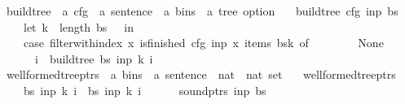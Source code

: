 \begin{isabellebody}
\isanewline
{}\isamarkupfalse%
\ build{\isacharunderscore}{\kern0pt}tree\ {\isacharcolon}{\kern0pt}{\isacharcolon}{\kern0pt}\ {\isachardoublequoteopen}{\isacharprime}{\kern0pt}a\ cfg\ {\isasymRightarrow}\ {\isacharprime}{\kern0pt}a\ sentence\ {\isasymRightarrow}\ {\isacharprime}{\kern0pt}a\ bins\ {\isasymRightarrow}\ {\isacharprime}{\kern0pt}a\ tree\ option{\isachardoublequoteclose}\ \isanewline
\ \ {\isachardoublequoteopen}build{\isacharunderscore}{\kern0pt}tree\ cfg\ inp\ bs\ {\isacharequal}{\kern0pt}\ {\isacharparenleft}{\kern0pt}\isanewline
\ \ \ \ let\ k\ {\isacharequal}{\kern0pt}\ length\ bs\ {\isacharminus}{\kern0pt}\ {}\ in\ {\isacharparenleft}{\kern0pt}\isanewline
\ \ \ \ case\ filter{\isacharunderscore}{\kern0pt}with{\isacharunderscore}{\kern0pt}index\ {\isacharparenleft}{\kern0pt}{\isasymlambda}x{\isachardot}{\kern0pt}\ is{\isacharunderscore}{\kern0pt}finished\ cfg\ inp\ x{\isacharparenright}{\kern0pt}\ {\isacharparenleft}{\kern0pt}items\ {\isacharparenleft}{\kern0pt}bs{\isacharbang}{\kern0pt}k{\isacharparenright}{\kern0pt}{\isacharparenright}{\kern0pt}\ of\isanewline
\ \ \ \ \ \ {\isacharbrackleft}{\kern0pt}{\isacharbrackright}{\kern0pt}\ {\isasymRightarrow}\ None\isanewline
\ \ \ \ {\isacharbar}{\kern0pt}\ {\isacharparenleft}{\kern0pt}{\isacharunderscore}{\kern0pt}{\isacharcomma}{\kern0pt}\ i{\isacharparenright}{\kern0pt}{\isacharhash}{\kern0pt}{\isacharunderscore}{\kern0pt}\ {\isasymRightarrow}\ build{\isacharunderscore}{\kern0pt}tree{\isacharprime}{\kern0pt}\ bs\ inp\ k\ i\isanewline
\ \ {\isacharparenright}{\kern0pt}{\isacharparenright}{\kern0pt}{\isachardoublequoteclose}\isanewline
\isanewline
\isanewline
{}\isamarkupfalse%
\ wellformed{\isacharunderscore}{\kern0pt}tree{\isacharunderscore}{\kern0pt}ptrs\ {\isacharcolon}{\kern0pt}{\isacharcolon}{\kern0pt}\ {\isachardoublequoteopen}{\isacharparenleft}{\kern0pt}{\isacharprime}{\kern0pt}a\ bins\ {\isasymtimes}\ {\isacharprime}{\kern0pt}a\ sentence\ {\isasymtimes}\ nat\ {\isasymtimes}\ nat{\isacharparenright}{\kern0pt}\ set{\isachardoublequoteclose}\ \isanewline
\ \ {\isachardoublequoteopen}wellformed{\isacharunderscore}{\kern0pt}tree{\isacharunderscore}{\kern0pt}ptrs\ {\isacharequal}{\kern0pt}\ {\isacharbraceleft}{\kern0pt}\isanewline
\ \ \ \ {\isacharparenleft}{\kern0pt}bs{\isacharcomma}{\kern0pt}\ inp{\isacharcomma}{\kern0pt}\ k{\isacharcomma}{\kern0pt}\ i{\isacharparenright}{\kern0pt}\ {\isacharbar}{\kern0pt}\ bs\ inp\ k\ i{\isachardot}{\kern0pt}\isanewline
\ \ \ \ \ \ sound{\isacharunderscore}{\kern0pt}ptrs\ inp\ bs\ {\isasymand}\isanewline

\end{isabellebody}
